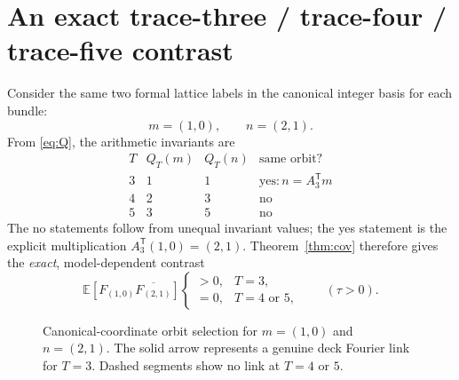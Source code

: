 \documentclass[11pt,a4paper]{article}
\begin{document}
\section{An exact trace-three / trace-four / trace-five contrast}
Consider the same two formal lattice labels in the
canonical integer basis for each bundle:
\[
m=(1,0),\qquad n=(2,1).
\]
From \eqref{eq:Q}, the arithmetic invariants are
\begin{equation}\label{eq:triplet}
\begin{array}{c|ccc}
T&Q_T(m)&Q_T(n)&\text{same orbit?}\\ \hline
3&1&1&\mathrm{yes}: n=A_3^{\mathsf T}m\\
4&2&3&\mathrm{no}\\
5&3&5&\mathrm{no}
\end{array}
\end{equation}
The no statements follow from unequal invariant
values; the yes statement is the explicit multiplication
$A_3^{\mathsf T}(1,0)=(2,1)$.
Theorem~\ref{thm:cov} therefore gives the
\emph{exact}, model-dependent contrast
\begin{equation}\label{eq:contrast}
\boxed{\quad
\mathbb E[F_{(1,0)}\overline{F_{(2,1)}}]
\begin{cases}
>0,&T=3,\\
=0,&T=4\text{ or }5,
\end{cases}
\qquad(\tau>0).
\quad}
\end{equation}
\begin{figure}[t]
\centering
{}
\caption{Canonical-coordinate orbit selection for
$m=(1,0)$ and $n=(2,1)$. The solid arrow
represents a genuine deck Fourier link for $T=3$.
Dashed segments show no link at $T=4$ or $5$.}
\label{fig:selection}
\end{figure}
\end{document}
